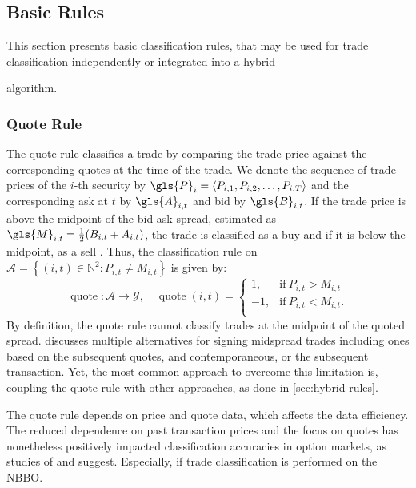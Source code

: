 \subsection{Basic Rules}\label{sec:basic-rules}

This section presents basic classification rules, that may be used for trade classification independently or integrated into a hybrid

 algorithm.

\subsubsection{Quote Rule}\label{sec:quote-rule}

The quote rule classifies a trade by comparing the trade price against the corresponding quotes at the time of the trade. We denote the sequence of trade prices of the $i$-th security by $\gls{P}_i = \langle P_{i,1},P_{i,2},\dots,P_{i,T}\rangle$ and the corresponding ask at $t$ by $\gls{A}_{i,t}$ and bid by $\gls{B}_{i,t}$. If the trade price is above the midpoint of the bid-ask spread, estimated as $\gls{M}_{i,t} = \tfrac{1}{2}(B_{i,t} + A_{i,t})$, the trade is classified as a buy and if it is below the midpoint, as a sell \autocite[][41]{harrisDayEndTransactionPrice1989}. Thus, the classification rule on $\mathcal{A} = \left\{(i, t) \in \mathbb{N}^2: P_{i,t} \neq M_{i,t}\right\}$ is given by:
\begin{equation}
    \operatorname{quote}\colon \mathcal{A} \to \mathcal{Y},\quad
    \operatorname{quote}(i, t)=
    \begin{cases}
        1,  & \mathrm{if}\ P_{i, t}>M_{i, t}  \\
        -1, & \mathrm{if}\ P_{i, t}<M_{i, t}. \\
    \end{cases}
\end{equation}
By definition, the quote rule cannot classify trades at the midpoint of the quoted spread. \textcite[][241]{hasbrouckTradesQuotesInventories1988} discusses multiple alternatives for signing midspread trades including ones based on the subsequent quotes, and contemporaneous, or the subsequent transaction. Yet, the most common approach to overcome this limitation is, coupling the quote rule with other approaches, as done in \cref{sec:hybrid-rules}.

The quote rule depends on price and quote data, which affects the data efficiency. The reduced dependence on past transaction prices and the focus on quotes has nonetheless positively impacted classification accuracies in option markets, as studies of \textcite[][886]{savickasInferringDirectionOption2003} and \textcite[][3]{grauerOptionTradeClassification2022} suggest. Especially, if trade classification is performed on the \gls{NBBO}.


